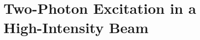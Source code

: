 \chapter[Two-Photon Excitation in a High-Intensity Beam]
  {Two-Photon Excitation in a\\ High-Intensity Beam}
  \label{chp:twophoton}